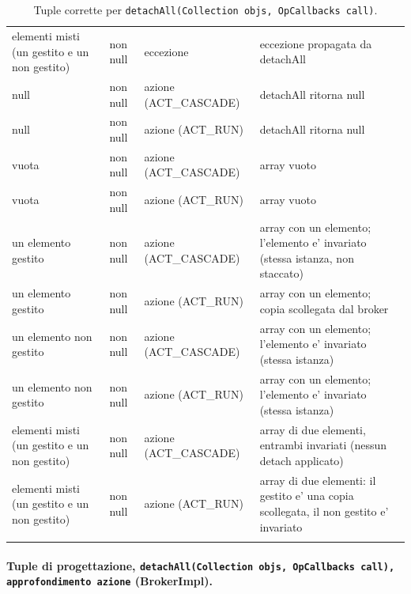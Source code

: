 {\begin{longtable}{>{\raggedright\arraybackslash}p{}>{\raggedright\arraybackslash}p{}>{\raggedright\arraybackslash}p{}>{\raggedright\arraybackslash}p{}}
elementi misti (un gestito e un non gestito) & non null & eccezione & eccezione propagata da detachAll \\
null & non null & azione (ACT\_CASCADE) & detachAll ritorna null \\
null & non null & azione (ACT\_RUN) & detachAll ritorna null \\
vuota & non null & azione (ACT\_CASCADE) & array vuoto \\
vuota & non null & azione (ACT\_RUN) & array vuoto \\
un elemento gestito & non null & azione (ACT\_CASCADE) & array con un elemento; l'elemento e' invariato (stessa istanza, non staccato) \\
un elemento gestito & non null & azione (ACT\_RUN) & array con un elemento; copia scollegata dal broker \\
un elemento non gestito & non null & azione (ACT\_CASCADE) & array con un elemento; l'elemento e' invariato (stessa istanza) \\
un elemento non gestito & non null & azione (ACT\_RUN) & array con un elemento; l'elemento e' invariato (stessa istanza) \\
elementi misti (un gestito e un non gestito) & non null & azione (ACT\_CASCADE) & array di due elementi, entrambi invariati (nessun detach applicato) \\
elementi misti (un gestito e un non gestito) & non null & azione (ACT\_RUN) & array di due elementi: il gestito e' una copia scollegata, il non gestito e' invariato \\
\bottomrule
\caption{Tuple corrette per \texttt{detachAll(Collection objs, OpCallbacks call)}.}
\label{tab:detachall-tuple-corrette}
\end{longtable}
}



\paragraph*{Tuple di progettazione, \texttt{detachAll(Collection objs, OpCallbacks call), approfondimento azione} (BrokerImpl).}

